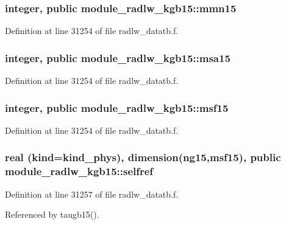 \subsubsection[{\texorpdfstring{mmn15}{mmn15}}]{\setlength{\rightskip}{0pt plus 5cm}integer, public module\+\_\+radlw\+\_\+kgb15\+::mmn15}\hypertarget{namespacemodule__radlw__kgb15_a8ab45999cfc7b9db0f3d3b61ccf803e8}{}\label{namespacemodule__radlw__kgb15_a8ab45999cfc7b9db0f3d3b61ccf803e8}


Definition at line 31254 of file radlw\+\_\+datatb.\+f.

\subsubsection[{\texorpdfstring{msa15}{msa15}}]{\setlength{\rightskip}{0pt plus 5cm}integer, public module\+\_\+radlw\+\_\+kgb15\+::msa15}\hypertarget{namespacemodule__radlw__kgb15_abb9e98034166a07a6e349631d7fbb2a3}{}\label{namespacemodule__radlw__kgb15_abb9e98034166a07a6e349631d7fbb2a3}


Definition at line 31254 of file radlw\+\_\+datatb.\+f.

\subsubsection[{\texorpdfstring{msf15}{msf15}}]{\setlength{\rightskip}{0pt plus 5cm}integer, public module\+\_\+radlw\+\_\+kgb15\+::msf15}\hypertarget{namespacemodule__radlw__kgb15_ae1b588ee60974c2d451c89f842601e07}{}\label{namespacemodule__radlw__kgb15_ae1b588ee60974c2d451c89f842601e07}


Definition at line 31254 of file radlw\+\_\+datatb.\+f.

\subsubsection[{\texorpdfstring{selfref}{selfref}}]{\setlength{\rightskip}{0pt plus 5cm}real (kind=kind\+\_\+phys), dimension(ng15,{\bf msf15}), public module\+\_\+radlw\+\_\+kgb15\+::selfref}\hypertarget{namespacemodule__radlw__kgb15_a1d14e9b2e607f2022d84c6fc0cd27c4e}{}\label{namespacemodule__radlw__kgb15_a1d14e9b2e607f2022d84c6fc0cd27c4e}


Definition at line 31257 of file radlw\+\_\+datatb.\+f.



Referenced by taugb15().

